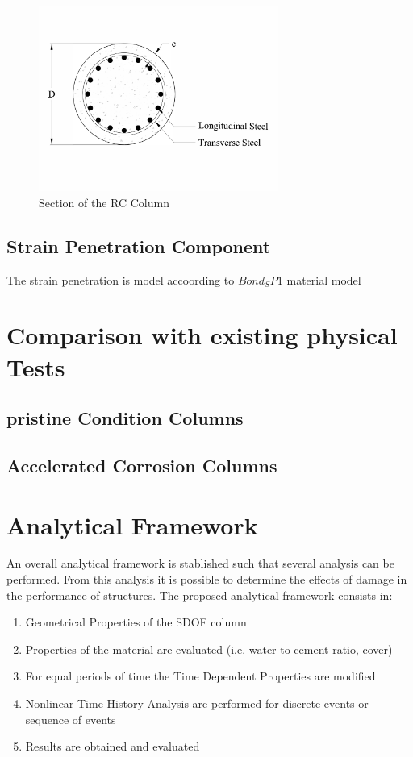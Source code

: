 \begin{figure}[htbp]
	\centering
	\includegraphics[width=0.7\textwidth]{Chapter-5/figs/StructuralModel_Section}
	\caption{Section of the RC Column}
	\label{fig:ColumnSection}
\end{figure}

\subsection{Strain Penetration Component}
The strain penetration is model accoording to $Bond_SP1$ material model \cite{Zhao2007}

\section{Comparison with existing physical Tests}
\subsection{pristine Condition Columns}
\lipsum[2]

\subsection{Accelerated Corrosion Columns}
\lipsum[3]

\section{Analytical Framework}

An overall analytical framework is stablished such that several analysis can be performed. From this analysis it is possible to determine the effects of damage in the performance of structures. The proposed analytical framework consists in:

\begin{enumerate}
	\item Geometrical Properties of the SDOF column 
	\item Properties of the material are evaluated (i.e. water to cement ratio, cover)
	\item For equal periods of time the Time Dependent Properties are modified
	\item Nonlinear Time History Analysis are performed for discrete events or sequence of events
	\item Results are obtained and evaluated
\end{enumerate}

